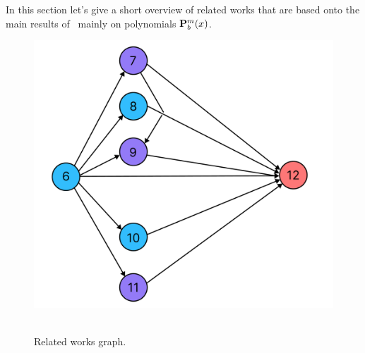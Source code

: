 In this section let's give a short overview of related works that are based
onto the main results of~\cite{kolosov2016link} mainly on polynomials ${\mathbf{P}}\sp{m} \sb{b}(x)$.
\begin{figure}[H]
    \centering
    \includegraphics[width=1\textwidth]{images/realated_works_graph}
    ~\caption{Related works graph.}\label{fig:related-works-graph}
\end{figure}
